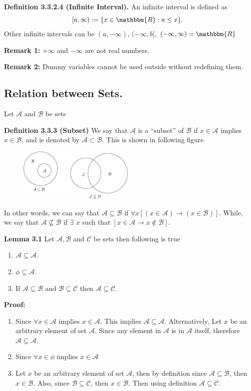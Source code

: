 \documentclass[a4paper,english,12pt]{article}
\begin{document}
\textbf{Definition 3.3.2.4 (Infinite Interval).} An infinite interval is defined as $$[a,\infty):= \{x\in \mathbbm{R}: a\leq x\}.$$ Other infinite intervals can be $(a,-\infty)$, $(-\infty,b]$, $(-\infty,\infty)=\mathbbm{R}$

\textbf{Remark 1:} $+\infty$ and $-\infty$ are not real numbers.

\textbf{Remark 2:} Dummy variables cannot be used outside without redefining them.
\subsection{Relation between Sets.}
 Let $\mathcal{A}$ and $\mathcal{B}$ be sets
 
 \textbf{Definition 3.3.3 (Subset)} We say that $\mathcal{A}$ is a ``subset'' of $\mathcal{B}$ if $x\in \mathcal{A}$ implies $x\in \mathcal{B}$, and is denoted by $\mathcal{A}\subset \mathcal{B}$. This is shown in following figure 
 
\begin{figure}[!h]
\centering
 \includegraphics[height=1.0in]{fig33.eps}
\end{figure}
In other words, we can say that $\mathcal{A}\subseteq \mathcal{B}$ if $\forall x [(x\in \mathcal{A}) \rightarrow (x\in\mathcal{B})]$. While, we say that $\mathcal{A}\nsubseteq\mathcal{B}$ if $\exists$ $x$ such that $[x\in\mathcal{A}\rightarrow x\not\in\mathcal{B}]$.

\textbf{Lemma 3.1} Let $\mathcal{A},\mathcal{B}$ and $\mathcal{C}$ be sets then following is true
\begin{enumerate}
 \item $\mathcal{A}\subseteq \mathcal{A}$.
 \item $\mathcal{\phi}\subseteq\mathcal{A}$.
 \item If $\mathcal{A}\subseteq\mathcal{B}$ and $\mathcal{B}\subseteq\mathcal{C}$ then $\mathcal{A}\subseteq\mathcal{C}$.
\end{enumerate}

\textbf{Proof: }
\begin{enumerate}
 \item Since $\forall x\in\mathcal{A}$ implies $x\in\mathcal{A}$. This implies $\mathcal{A}\subseteq \mathcal{A}$. Alternatively, Let $x$ be an arbitrary element of set $\mathcal{A}$. Since any element in $\mathcal{A}$ is in $\mathcal{A}$ itself, therefore $\mathcal{A}\subseteq \mathcal{A}$.
 \item Since $\forall x \in \mathcal{\phi}$ implies $ x \in \mathcal{A}$
 \item Let $x$ be an arbitrary element of set $\mathcal{A}$, then by definition since $\mathcal{A}\subseteq \mathcal{B}$, then $x\in \mathcal{B}$. Also, since $\mathcal{B}\subseteq\mathcal{C}$, then $x\in \mathcal{B}$. Then using definition $\mathcal{A}\subseteq\mathcal{C}$.
\end{enumerate}
\end{document}

